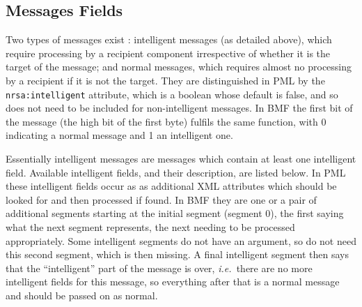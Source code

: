 \documentclass[pdftex,a4paper]{article}
\newif\ifpdf
\newcommand{\ie}{{\em i.e.\ }}
\newcommand{\XMLfont}[1]{{\tt \small #1}}
\begin{document}
\subsection{Messages Fields}

\ifpdf
\begin{figure}[htb]
  \begin{center}
    \texttt{[image: route\_building.pdf]}
    \caption{Illustration of forward and return route building inside an
    intelligent message. A message is show as it is sent from the
    NRS.gui to the robot (\ie left to right). As the message travels
    along its route -- which includes through a FIFO and serial
    connection -- the two intelligent fields
    \XMLfont{nrsa:iForwardRoute} and \XMLfont{nrsa:iReturnRoute} have
    their content progressively built up. Whenever a message leaves a
    component through a particular port, the port number is
    \emph{appended} to the \XMLfont{nrsa:iForwardRoute}, whereas
    whenever a message enters a component through a particular part, the
    port number is \emph{prepended} to the \XMLfont{nrsa:iReturnRoute}.}
    \label{pic:route_building}
  \end{center}
\end{figure}
\fi

Two types of messages exist : intelligent messages (as detailed above),
which require processing by a recipient component irrespective of
whether it is the target of the message; and normal messages, which
requires almost no processing by a recipient if it is not the
target. They are distinguished in PML by the \XMLfont{nrsa:intelligent}
attribute, which is a boolean whose default is false, and so does not
need to be included for non-intelligent messages. In BMF the first bit
of the message (the high bit of the first byte) fulfils the same
function, with 0 indicating a normal message and 1 an intelligent one.

Essentially intelligent messages are messages which contain at least one
intelligent field. Available intelligent fields, and their description,
are listed below. In PML these intelligent fields occur as as additional
XML attributes which should be looked for and then processed if
found. In BMF they are one or a pair of additional segments starting at
the initial segment (segment 0), the first saying what the next segment
represents, the next needing to be processed appropriately. Some
intelligent segments do not have an argument, so do not need this second
segment, which is then missing. A final intelligent segment then says
that the ``intelligent'' part of the message is over, \ie there are no
more intelligent fields for this message, so everything after that is a
normal message and should be passed on as normal.
\end{document}

